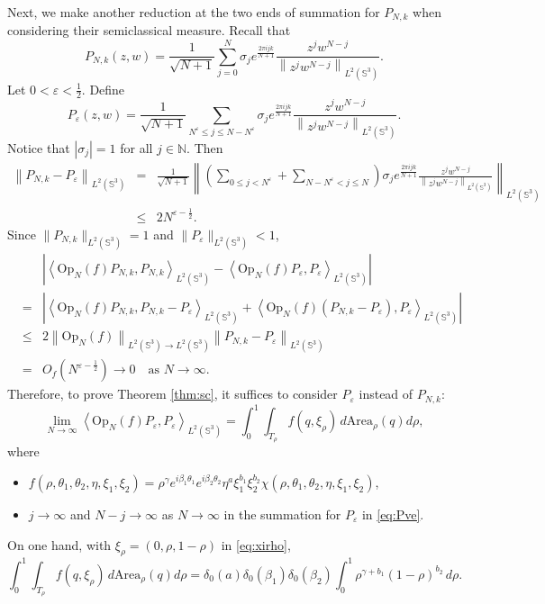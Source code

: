 \documentclass[12pt,reqno]{amsart}
\newcommand\Area{\mathrm{Area}}
\newcommand\N{\mathbb{N}}
\newcommand\Op{\mathrm{Op}}
\newcommand\Sb{\mathbb{S}}
\newcommand\ve{\varepsilon}
\theoremstyle{plain}
\theoremstyle{remark}
\numberwithin{equation}{section}
\begin{document}
Next, we make another reduction at the two ends of summation for $P_{N,k}$ when considering their semiclassical measure. Recall that
$$P_{N,k}(z,w)=\frac{1}{\sqrt{N+1}}\sum_{j=0}^N\sigma_je^{\frac{2\pi ijk}{N+1}}\frac{z^jw^{N-j}}{\left\|z^jw^{N-j}\right\|_{L^2(\Sb^3)}}.$$
Let $0<\ve<\frac12$. Define
\begin{equation}\label{eq:Pve}
P_\ve(z,w)=\frac{1}{\sqrt{N+1}}\sum_{N^\ve\le j\le N-N^\ve}\sigma_je^{\frac{2\pi ijk}{N+1}}\frac{z^jw^{N-j}}{\left\|z^jw^{N-j}\right\|_{L^2(\Sb^3)}}.
\end{equation}
Notice that $|\sigma_j|=1$ for all $j\in\N$. Then
\begin{eqnarray*}
\left\|P_{N,k}-P_\ve\right\|_{L^2(\Sb^3)}&=&\frac{1}{\sqrt{N+1}}\left\|\left(\sum_{0\le j<N^\ve}+\sum_{N-N^\ve<j\le N}\right)\sigma_je^{\frac{2\pi ijk}{N+1}}\frac{z^jw^{N-j}}{\left\|z^jw^{N-j}\right\|_{L^2(\Sb^3)}}\right\|_{L^2(\Sb^3)}\\
&\le&2N^{\ve-\frac12}.
\end{eqnarray*}
Since $\|P_{N,k}\|_{L^2(\Sb^3)}=1$ and $\|P_\ve\|_{L^2(\Sb^3)}<1$,
\begin{eqnarray*}
&&\left|\left\langle\Op_N(f)P_{N,k},P_{N,k}\right\rangle_{L^2(\Sb^3)}-\left\langle\Op_N(f)P_\ve,P_\ve\right\rangle_{L^2(\Sb^3)}\right|\\
&=&\left|\left\langle\Op_N(f)P_{N,k},P_{N,k}-P_\ve\right\rangle_{L^2(\Sb^3)}+\left\langle\Op_N(f)\left(P_{N,k}-P_\ve\right),P_\ve\right\rangle_{L^2(\Sb^3)}\right|\\
&\le&2\left\|\Op_N(f)\right\|_{L^2(\Sb^3)\to L^2(\Sb^3)}\left\|P_{N,k}-P_\ve\right\|_{L^2(\Sb^3)}\\
&=&O_f\left(N^{\ve-\frac12}\right)\to0\quad\text{as }N\to\infty.
\end{eqnarray*}
Therefore, to prove Theorem \ref{thm:sc}, it suffices to consider $P_\ve$ instead of $P_{N,k}$:
$$\lim_{N\to\infty}\left\langle\Op_N(f)P_\ve,P_\ve\right\rangle_{L^2(\Sb^3)}=\int_0^1\int_{T_\rho}f\left(q,\xi_\rho\right)\,d\Area_\rho(q)d\rho,$$
where 
\begin{itemize}
\item $f(\rho,\theta_1,\theta_2,\eta,\xi_1,\xi_2)=\rho^\gamma e^{i\beta_1\theta_1}e^{i\beta_2\theta_2}\eta^a\xi_1^{b_1}\xi_2^{b_2}\chi(\rho,\theta_1,\theta_2,\eta,\xi_1,\xi_2)$, 
\item $j\to\infty$ and $N-j\to\infty$ as $N\to\infty$ in the summation for $P_\ve$ in \eqref{eq:Pve}.
\end{itemize}
On one hand, with $\xi_\rho=(0,\rho,1-\rho)$ in \eqref{eq:xirho}, 
\begin{equation}\label{eq:0}
\int_0^1\int_{T_\rho}f\left(q,\xi_\rho\right)\,d\Area_\rho(q)d\rho=\delta_0(a)\delta_0\left(\beta_1\right)\delta_0\left(\beta_2\right)\int_0^1\rho^{\gamma+b_1}(1-\rho)^{b_2}\,d\rho.
\end{equation}
\end{document}
